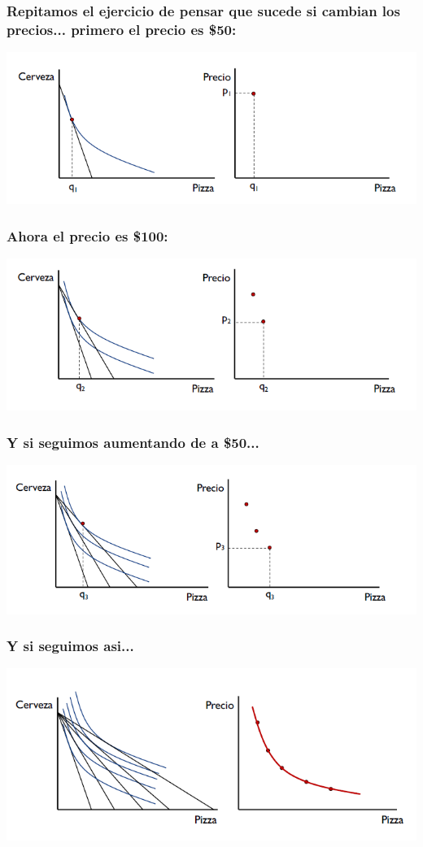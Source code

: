 \documentclass{beamer}
\begin{document}
\begin{frame}
\frametitle{Repitamos el ejercicio de pensar que sucede si cambian los precios... primero el precio es \$50:}
\centering
\includegraphics[scale=0.6]{Slides Principios de Economia/Figures/Tema_02.53_derivacioncurvademanda.png}
\end{frame}

\begin{frame}
\frametitle{Ahora el precio es \$100:}
\centering
\includegraphics[scale=0.6]{Slides Principios de Economia/Figures/Tema_02.54_derivacioncurvademanda1.png}
\end{frame}

\begin{frame}
\frametitle{Y si seguimos aumentando de a \$50...}
\centering
\includegraphics[scale=0.6]{Slides Principios de Economia/Figures/Tema_02.55_derivacioncurvademanda2.png}
\end{frame}

\begin{frame}
\frametitle{Y si seguimos asi...}
\centering
\includegraphics[scale=0.6]{Slides Principios de Economia/Figures/Tema_02.56_derivacioncurvademanda3.png}
\end{frame}
\end{document}
